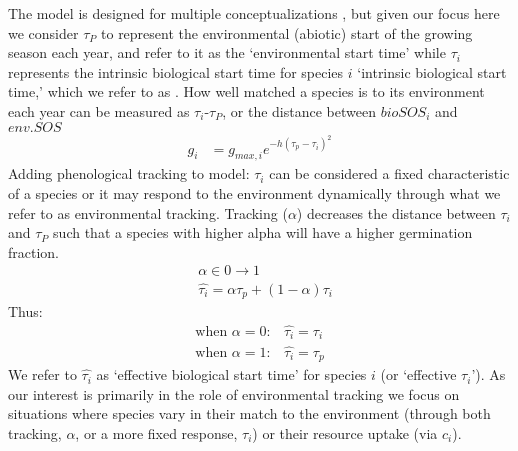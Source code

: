 \documentclass[11pt,letterpaper]{article}
\begin{document}
The model is designed for multiple conceptualizations \citep{Chesson:2004eo}, but given our focus here we consider $\tau_P$ to represent the environmental (abiotic) start of the growing season each year, and refer to it as the `environmental start time' while $\tau_i$ represents the intrinsic biological start time for species $i$ `intrinsic biological start time,' which we refer to as . How well matched a species is to its environment each year can be measured as $\tau_i$-$\tau_P$, or the distance between $bioSOS_i$ and $env.SOS$
\begin{align}
g_{i} & = g_{max,i}e^{-h(\tau_{p}-\tau_{i})^2} 
\end{align}
\noindent Adding phenological tracking to model: 
$\tau_i$ can be considered a fixed characteristic of a species or it may respond to the environment dynamically through what we refer to as environmental tracking. Tracking ($\alpha$) decreases the distance between $\tau_i$ and $\tau_P$ such that a species with higher alpha will have a higher germination fraction.
\begin{align}
& \alpha \in 0 \rightarrow 1
\\
&\hat{\tau_{i}} = \alpha \tau_{p} + (1-\alpha)\tau_{i}
\end{align}
\noindent Thus:
\begin{align*}
\text{when } \alpha = 0: & \hat{\tau_{i}}=\tau_{i}
\\
\text{when }  \alpha = 1: & \hat{\tau_{i}}=\tau_{p}
\end{align*}
We refer to $\hat{\tau_{i}}$ as `effective biological start time' for species $i$ (or `effective $\tau_i$'). As our interest is primarily in the role of environmental tracking we focus on situations where species vary in their match to the environment (through both tracking, $\alpha$, or a more fixed response, $\tau_i$) or their resource uptake (via $c_i$).
\end{document}
